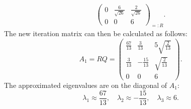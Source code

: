 \documentclass{exercise}
\begin{document}
\begin{enumerate}
\begin{align*}
{\begin{pmatrix}
				0 & \frac{6}{\sqrt{26}} & \frac{2}{\sqrt{26}}\\
				0 & 0 & 6
			\end{pmatrix}}_{=: R}.
		\end{align*}
		The new iteration matrix can then be calculated as follows:
		\[
			A_1 = RQ = \begin{pmatrix}
				\frac{67}{13} & \frac{3}{13} & 5\sqrt{\frac{2}{13}}\\
				\frac{3}{13} & -\frac{15}{13} & \sqrt{\frac{2}{13}}\\
				0 & 0 & 6
			\end{pmatrix}.
		\]
		The approximated eigenvalues are on the diagonal of \(A_1\):
		\[
			\lambda_1 \approx \frac{67}{13}, \quad \lambda_2 \approx -\frac{15}{13}, \quad \lambda_3 \approx 6.
		\]
	\end{enumerate}
\end{document}
